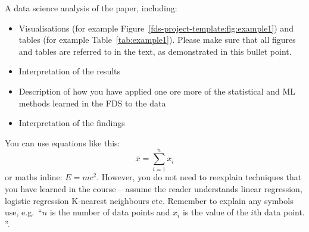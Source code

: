     A data science analysis of the paper, including: \begin{itemize} \item
        Visualisations (for example Figure~\ref{fds-project-template:fig:example1}) and
        tables (for example Table~\ref{tab:example1}).
    Please make sure that all figures and tables are referred to in the text, as
        demonstrated in this bullet point.
    \item Interpretation of the results
    \item Description of how you have applied one ore more of the
    statistical and ML methods learned in the FDS to the data
    \item Interpretation of the findings
    \end{itemize}

    You can use equations like this:
    \begin{equation}
        \label{fds-project-template:eq:1} \overline{x} = \sum_{i=1}^n x_i
    \end{equation}
    or maths inline: $E=mc^2$.
    However, you do not need to reexplain techniques that you have learned in the
        course -- assume the reader understands linear regression, logistic regression
        K-nearest neighbours etc. Remember to explain any symbols use, e.g.~``$n$ is
        the number of data points and $x_i$ is the value of the $i$th data point.
    ''.